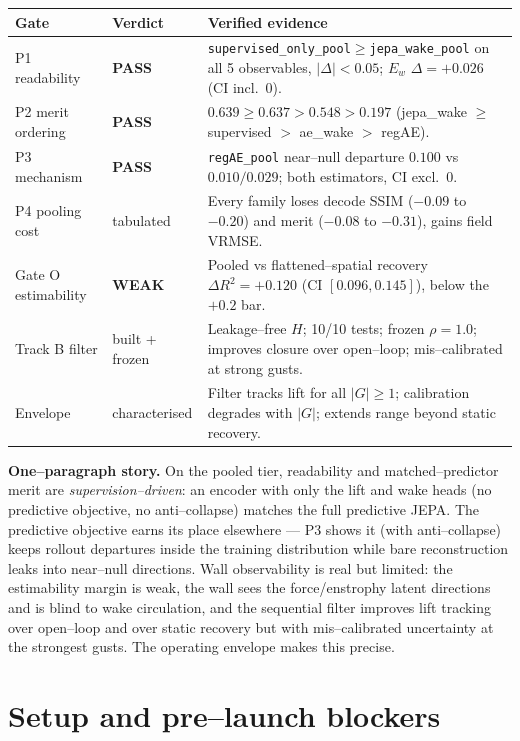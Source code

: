 \documentclass[11pt]{article}
\newcommand{\pass}{\textcolor{green!55!black}{\textbf{PASS}}}
\newcommand{\weak}{\textcolor{orange!80!black}{\textbf{WEAK}}}
\begin{document}
\begin{center}
\begin{tabular}{@{}llp{8.6cm}@{}}
\toprule
Gate & Verdict & Verified evidence \\
\midrule
P1 readability      & \pass & \texttt{supervised\_only\_pool}$\ge$\texttt{jepa\_wake\_pool} on all 5 observables, $|\Delta|<0.05$; $E_w$ $\Delta{=}{+}0.026$ (CI incl.\ 0). \\
P2 merit ordering   & \pass & $0.639 \ge 0.637 > 0.548 > 0.197$ (jepa\_wake $\ge$ supervised $>$ ae\_wake $>$ regAE). \\
P3 mechanism        & \pass & \texttt{regAE\_pool} near--null departure $0.100$ vs $0.010/0.029$; both estimators, CI excl.\ 0. \\
P4 pooling cost     & tabulated & Every family loses decode SSIM ($-0.09$ to $-0.20$) and merit ($-0.08$ to $-0.31$), gains field VRMSE. \\
Gate O estimability & \weak & Pooled vs flattened--spatial recovery $\Delta R^2 = +0.120$ (CI $[0.096,0.145]$), below the $+0.2$ bar. \\
Track B filter      & built + frozen & Leakage--free $H$; 10/10 tests; frozen $\rho{=}1.0$; improves closure over open--loop; mis--calibrated at strong gusts. \\
Envelope            & characterised & Filter tracks lift for all $|G|\ge 1$; calibration degrades with $|G|$; extends range beyond static recovery. \\
\bottomrule
\end{tabular}
\end{center}

\textbf{One--paragraph story.} On the pooled tier, readability and matched--predictor merit are
\emph{supervision--driven}: an encoder with only the lift and wake heads (no predictive
objective, no anti--collapse) matches the full predictive JEPA. The predictive objective earns
its place elsewhere --- P3 shows it (with anti--collapse) keeps rollout departures inside the
training distribution while bare reconstruction leaks into near--null directions. Wall
observability is real but limited: the estimability margin is weak, the wall sees the
force/enstrophy latent directions and is blind to wake circulation, and the sequential filter
improves lift tracking over open--loop and over static recovery but with mis--calibrated
uncertainty at the strongest gusts. The operating envelope makes this precise.

\section{Setup and pre--launch blockers}
\end{document}
